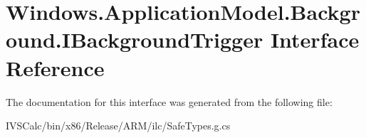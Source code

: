 \hypertarget{interface_windows_1_1_application_model_1_1_background_1_1_i_background_trigger}{}\section{Windows.\+Application\+Model.\+Background.\+I\+Background\+Trigger Interface Reference}
\label{interface_windows_1_1_application_model_1_1_background_1_1_i_background_trigger}


The documentation for this interface was generated from the following file\+:\begin{DoxyCompactItemize}
\item 
I\+V\+S\+Calc/bin/x86/\+Release/\+A\+R\+M/ilc/Safe\+Types.\+g.\+cs\end{DoxyCompactItemize}
